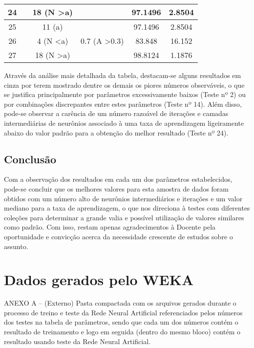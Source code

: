 \documentclass[
	article,			%
	11pt,				%
	oneside,			%
	a4paper,			%
	english,			%
	brazil,				%
	sumario=tradicional
	]{abntex2}
\begin{document}
\begin{table}[h]
\begin{tabular}{|c|c|c|c|c|c|}
		24 &                           & 18 (N \textgreater a) &                          & 97.1496                    & 2.8504                   \\ \hline
		25 &                           & 11 (a)                &                          & 97.1496                    & 2.8504                   \\ \hline
		26 &                           & 4 (N \textless a)     & 0.7 (A \textgreater 0.3) & 83.848                     & 16.152                   \\ \hline
		27 &                           & 18 (N \textgreater a) &                          & 98.8124                    & 1.1876                   \\ \hline
	\end{tabular}
\end{table}

Através da análise mais detalhada da tabela, destacam-se alguns resultados em cinza por terem mostrado dentre os demais os piores números observáveis, o que se justifica principalmente por parâmetros excessivamente baixos (Teste nº 2) ou por combinações discrepantes entre estes parâmetros (Teste nº 14). Além disso, pode-se observar a carência de um número razoável de iterações e camadas intermediárias de neurônios associado à uma taxa de aprendizagem ligeiramente abaixo do valor padrão para a obtenção do melhor resultado (Teste nº 24).

\section{Conclusão}

Com a observação dos resultados em cada um dos parâmetros estabelecidos, pode-se concluir que os melhores valores para esta amostra de dados foram obtidos com um número alto de neurônios intermediários e iterações e um valor mediano para a taxa de aprendizagem, o que nos direciona à testes com diferentes coleções para determinar a grande valia e possível utilização de valores similares como padrão. Com isso, restam apenas agradecimentos à Docente pela oportunidade e convicção acerca da necessidade crescente de estudos sobre o assunto. 





\newpage


\newpage 
\appendix
\chapter{Dados gerados pelo WEKA}

ANEXO A – (Externo) Pasta compactada com os arquivos gerados durante o processo de treino e teste da Rede Neural Artificial referenciados pelos números dos testes na tabela de parâmetros, sendo que cada um dos números contém o resultado de treinamento e logo em seguida (dentro do mesmo bloco) contém o resultado usando teste da Rede Neural Artificial.
\end{document}

